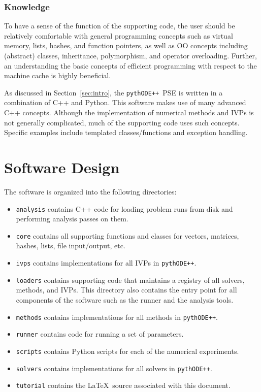 \documentclass[11pt]{article}
\newcommand{\pypp}{\texttt{pythODE++}}
\begin{document}
\subsubsection{Knowledge}

To have a sense of the function of the supporting code, the user should be relatively comfortable with general programming concepts such as virtual memory, lists, hashes, and function pointers, as well as \ac{OO} concepts including (abstract) classes, inheritance, polymorphism, and operator overloading.
Further, an understanding the basic concepts of efficient programming with respect to the machine cache is highly beneficial.

As discussed in Section~\ref{sec:intro}, the \pypp\ \ac{PSE} is written in a combination of C++ and Python.
This software makes use of many advanced C++ concepts.
Although the implementation of numerical methods and \acp{IVP} is not generally complicated, much of the supporting code uses such concepts.
Specific examples include templated classes/functions and exception handling.

\section{Software Design}

The software is organized into the following directories:
\begin{itemize}
\item \verb=analysis= contains C++ code for loading problem runs from disk and performing analysis passes on them.
\item \verb=core= contains all supporting functions and classes for vectors, matrices, hashes, lists, file input/output, etc.
\item \verb=ivps= contains implementations for all \acp{IVP} in \pypp.
\item \verb=loaders= contains supporting code that maintains a registry of all solvers, methods, and IVPs. This directory also contains the entry point for all components of the software such as the runner and the analysis tools.
\item \verb=methods= contains implementations for all methods in \pypp.
\item \verb=runner= contains code for running a set of parameters.
\item \verb=scripts= contains Python scripts for each of the numerical experiments.
\item \verb=solvers= contains implementations for all solvers in \pypp.
\item \verb=tutorial= contains the \LaTeX\ source associated with this document.
\end{itemize}
\end{document}

